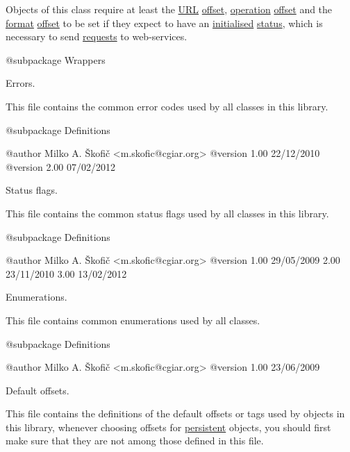 Objects of this class require at least the \hyperlink{}{U\-R\-L} \hyperlink{}{offset}, \hyperlink{}{operation} \hyperlink{}{offset} and the \hyperlink{}{format} \hyperlink{}{offset} to be set if they expect to have an \hyperlink{}{initialised} \hyperlink{}{status}, which is necessary to send \hyperlink{}{requests} to web-\/services.

\begin{DoxyVerb}    @subpackage     Wrappers\end{DoxyVerb}


Errors.

This file contains the common error codes used by all classes in this library.

\begin{DoxyVerb}    @subpackage     Definitions

    @author         Milko A. Škofič <m.skofic@cgiar.org>
    @version        1.00 22/12/2010
    @version        2.00 07/02/2012\end{DoxyVerb}


Status flags.

This file contains the common status flags used by all classes in this library.

\begin{DoxyVerb}    @subpackage     Definitions

    @author         Milko A. Škofič <m.skofic@cgiar.org>
    @version        1.00 29/05/2009
                            2.00 23/11/2010
                            3.00 13/02/2012\end{DoxyVerb}


Enumerations.

This file contains common enumerations used by all classes.

\begin{DoxyVerb}    @subpackage     Definitions

    @author         Milko A. Škofič <m.skofic@cgiar.org>
    @version        1.00 23/06/2009\end{DoxyVerb}


\begin{DoxyVerb}   Default offsets.
\end{DoxyVerb}


This file contains the definitions of the default offsets or tags used by objects in this library, whenever choosing offsets for \hyperlink{class_c_persistent_object}{persistent} objects, you should first make sure that they are not among those defined in this file.

